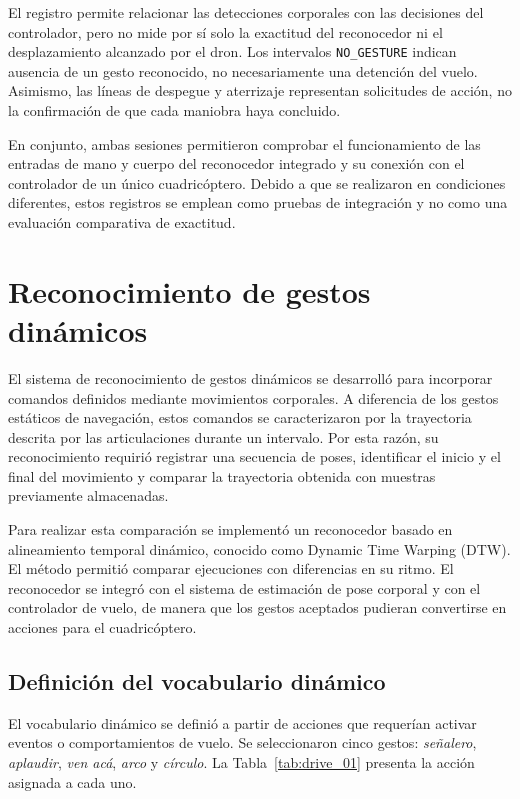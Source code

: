 El registro permite relacionar las detecciones corporales con las decisiones del controlador, pero no mide por sí solo la exactitud del reconocedor ni el desplazamiento alcanzado por el dron. Los intervalos \texttt{NO\_GESTURE} indican ausencia de un gesto reconocido, no necesariamente una detención del vuelo. Asimismo, las líneas de despegue y aterrizaje representan solicitudes de acción, no la confirmación de que cada maniobra haya concluido.

En conjunto, ambas sesiones permitieron comprobar el funcionamiento de las entradas de mano y cuerpo del reconocedor integrado y su conexión con el controlador de un único cuadricóptero. Debido a que se realizaron en condiciones diferentes, estos registros se emplean como pruebas de integración y no como una evaluación comparativa de exactitud.

\chapter{Reconocimiento de gestos dinámicos}

El sistema de reconocimiento de gestos dinámicos se desarrolló para incorporar comandos definidos mediante movimientos corporales. A diferencia de los gestos estáticos de navegación, estos comandos se caracterizaron por la trayectoria descrita por las articulaciones durante un intervalo. Por esta razón, su reconocimiento requirió registrar una secuencia de poses, identificar el inicio y el final del movimiento y comparar la trayectoria obtenida con muestras previamente almacenadas.

Para realizar esta comparación se implementó un reconocedor basado en alineamiento temporal dinámico, conocido como Dynamic Time Warping (DTW). El método permitió comparar ejecuciones con diferencias en su ritmo. El reconocedor se integró con el sistema de estimación de pose corporal y con el controlador de vuelo, de manera que los gestos aceptados pudieran convertirse en acciones para el cuadricóptero.

\section{Definición del vocabulario dinámico}

El vocabulario dinámico se definió a partir de acciones que requerían activar eventos o comportamientos de vuelo. Se seleccionaron cinco gestos: \textit{señalero}, \textit{aplaudir}, \textit{ven acá}, \textit{arco} y \textit{círculo}. La Tabla~\ref{tab:drive_01} presenta la acción asignada a cada uno.

